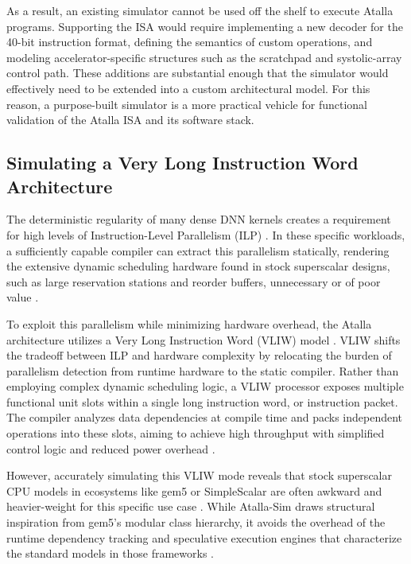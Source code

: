 As a result, an existing simulator cannot be used off the shelf to execute Atalla programs. Supporting the ISA would require implementing a new decoder for the 40-bit instruction format, defining the semantics of custom operations, and modeling accelerator-specific structures such as the scratchpad and systolic-array control path. These additions are substantial enough that the simulator would effectively need to be extended into a custom architectural model. For this reason, a purpose-built simulator is a more practical vehicle for functional validation of the Atalla ISA and its software stack.

\subsection{Simulating a Very Long Instruction Word Architecture}
The deterministic regularity of many dense DNN kernels creates a requirement for high levels of Instruction-Level Parallelism (ILP) \cite{scpadfinalreport, casvliw}. In these specific workloads, a sufficiently capable compiler can extract this parallelism statically, rendering the extensive dynamic scheduling hardware found in stock superscalar designs, such as large reservation stations and reorder buffers, unnecessary or of poor value \cite{vliw}.

To exploit this parallelism while minimizing hardware overhead, the Atalla architecture utilizes a Very Long Instruction Word (VLIW) model \cite{schedulerfinalreport}. VLIW shifts the tradeoff between ILP and hardware complexity by relocating the burden of parallelism detection from runtime hardware to the static compiler. Rather than employing complex dynamic scheduling logic, a VLIW processor exposes multiple functional unit slots within a single long instruction word, or instruction packet. The compiler analyzes data dependencies at compile time and packs independent operations into these slots, aiming to achieve high throughput with simplified control logic and reduced power overhead \cite{vliw}.

However, accurately simulating this VLIW mode reveals that stock superscalar CPU models in ecosystems like gem5 or SimpleScalar are often awkward and heavier-weight for this specific use case \cite{casvliw, simplevliw}. While Atalla-Sim draws structural inspiration from gem5’s modular class hierarchy, it avoids the overhead of the runtime dependency tracking and speculative execution engines that characterize the standard models in those frameworks \cite{casvliw, gem5}.

